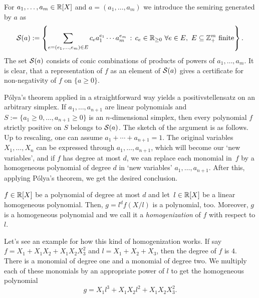 For $a_1,\ldots,a_m \in \mathbb{R}[X]$ and $a=(a_1,\ldots,a_m)$ we introduce the semiring generated by $a$ as 
\[
	\cS(a) := \setcond{\sum_{e=(e_1,\ldots,e_m) \in E} c_e a_1^{e_1} \cdots a_m^{e_m} }{c_e \in \R_{\ge 0} \ \forall e \in E, \ E \subseteq \Z_+^m \ \text{finite}}.
\]
The set $\mathcal{S}(a)$ consists of conic combinations of products of powers of $a_1,\ldots,a_m$. It is clear, that a representation of $f$ as an element of $\mathcal{S}(a)$ gives a certificate for non-negativity of $f$ on $\{a \ge 0\}$. 

\begin{remark}
P\'olya's theorem applied in a straightforward way yields a positivstellensatz on an arbitrary simplex. If $a_1,\ldots,a_{n+1}$ are linear polynomials and $S:=\{a_1 \ge 0,\ldots, a_{n+1} \ge 0\}$ is an $n$-dimensional simplex, then every polynomial $f$ strictly positive on $S$ belongs to $\mathcal{S}(a)$. The sketch of the argument is as follows. Up to rescaling, one can assume $a_1 + \cdots + a_{n+1} = 1$. The original variables $X_1,\ldots,X_n$ can be expressed through $a_1,\ldots,a_{n+1}$, which will become our `new variables', and if $f$ has degree at most $d$, we can replace each monomial in~$f$ by a homogeneous polynomial of degree $d$ in `new variables' $a_1,\ldots,a_{n+1}$. After this, applying P\'olya's theorem, we get the desired conclusion. 
\end{remark}

$f \in \mathbb{R}[X]$ be a polynomial of degree at most $d$ and let~$l \in \mathbb{R}[X]$ be a linear homogeneous polynomial.
Then, $g = l^d f (X/l)$ is a polynomial, too. Moreover, $g$ is a homogeneous polynomial and we call it a \emph{homogenization} of $f$ with respect to $l$.

Let's see an example for how this kind of homogenization works. If  say $f = X_1 + X_1 X_2 + X_1 X_2 X_3^2$ and $l=X_1 + X_2 +X_3$, then the degree of $f$ is $4$. There is a monomial of degree one and a monomial of degree two. We multiply each of these monomials by an appropriate power of $l$ to get the homogeneous polynomial
\[
	g = X_1 l^3 + X_1 X_2 l^2 + X_1 X_2 X_3^2. 
\]

%

